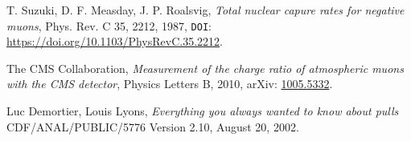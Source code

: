 \documentclass[a4paper, 12pt]{report}
\begin{document}
\begin{thebibliography}{30}
 T. Suzuki, D. F. Measday, J. P. Roalsvig, \emph{Total nuclear capure rates for negative muons}, Phys. Rev. C 35, 2212, 1987, \texttt{DOI}: \url{https://doi.org/10.1103/PhysRevC.35.2212}.

 The CMS Collaboration, \emph{Measurement of the charge ratio of atmospheric muons with the CMS detector}, Physics Letters B, 2010, arXiv: \href{https://arxiv.org/pdf/1005.5332.pdf}{1005.5332}.

 Luc Demortier, Louis Lyons,
\emph{Everything you always wanted to know about pulls} CDF/ANAL/PUBLIC/5776 Version 2.10, August 20, 2002.

\end{thebibliography}
\end{document}
